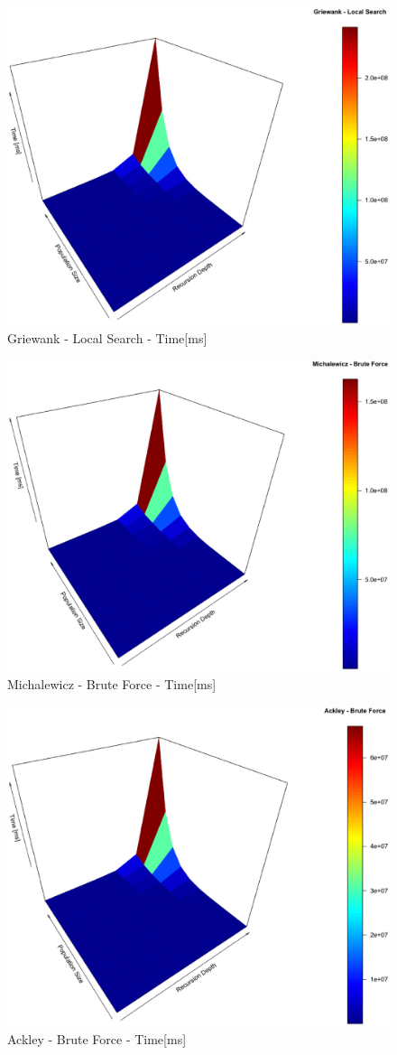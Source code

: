 \documentclass{svproc}
\begin{document}
\begin{figure}[tbp]
\centering
\includegraphics[width=1.0\hsize,height=0.65\hsize]{fig14.eps}
\caption{Griewank - Local Search - Time[ms]}
\label{fig15}
\end{figure}

\begin{figure}[tbp]
\centering
\includegraphics[width=1.0\hsize,height=0.65\hsize]{fig17.eps}
\caption{Michalewicz - Brute Force - Time[ms]}
\label{fig16}
\end{figure}

\begin{figure}[tbp]
\centering
\includegraphics[width=1.0\hsize,height=0.65\hsize]{fig20.eps}
\caption{Ackley - Brute Force - Time[ms]}
\label{fig17}
\end{figure}
\end{document}
